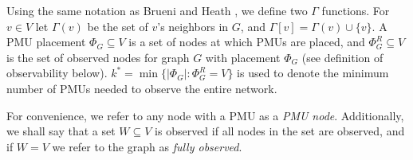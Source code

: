 Using the same notation as Brueni and Heath \cite{Brueni05}, we define two $\Gamma$ functions. For $v\in V$ let $\Gamma(v)$ be the set of $v$'s neighbors in $G$, and $\Gamma[v] = \Gamma(v)\cup \{v\}$.
A PMU placement $\Phi_G \subseteq V$ is a set of nodes at which PMUs are placed,
and $\Phi^R_G\subseteq V$ is the set of observed nodes for graph $G$ with placement $\Phi_G$ (see definition of observability below). %
$k^* = \min \{|\Phi_G|:\Phi^R_G=V\}$ is used to denote the minimum number of PMUs needed to observe the entire network.


For convenience, we refer to any node with a PMU as a \emph{PMU node}. Additionally, we shall say that a set $W\subseteq V$ is observed if all nodes in the set are observed, and if $W=V$ we refer to the graph as \emph{fully observed}. 


\begin{comment}
\begin{table}[t]
\begin{center}
\begin{tabular}{l l} 
\hline \hline
   	{\bf Notation} & {\bf Meaning} \\
		  \hline 
		  	$G$ &  undirected graph $(V,E)$ where each $v \in V$ is a bus and each \\
				&  $(u,v) \in E$ is a transmission line connecting $u$ and $v$\\
			$\Gamma(v)$ & $\{u \in V$ $|$ $(u,v) \in E \}$ \\ 
			$\Gamma[v]$ & $\Gamma(v) \cup \{v\}$ \\
 		 	$n$ & $|V|$ \\
			$\Phi$ & a subset of $V$ in which PMUs are placed such that all \\ 
				   & $v \in V$ and all $(u,v) \in E$ observed  \\
			$\Phi^R$ & set of observed nodes \\
			$\Phi^-$ & set of observed edges \\
			\hline \hline
	\end{tabular}
	\end{center}
\caption{Notation Table}
\label{tab:notation}
\end{table}
\end{comment}

